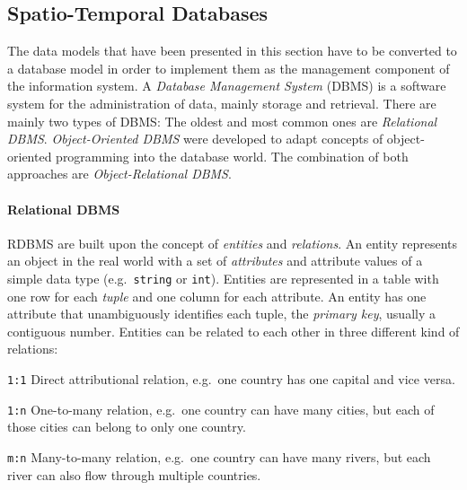 

\subsection{Spatio-Temporal Databases} %
\label{sub:spatio_temporal_databases}

The data models that have been presented in this section have to be converted to a database model in order to implement them as the management component of the information system. A \emph{Database Management System} (DBMS) is a software system for the administration of data, mainly storage and retrieval. There are mainly two types of DBMS: The oldest and most common ones are \emph{Relational DBMS}. \emph{Object-Oriented DBMS} were developed to adapt concepts of object-oriented programming into the database world. The combination of both approaches are \emph{Object-Relational DBMS}.

\paragraph{Relational DBMS} %
\label{par:relational_dbms}

RDBMS are built upon the concept of \emph{entities} and \emph{relations}. An entity represents an object in the real world with a set of \emph{attributes} and attribute values of a simple data type (e.g.\ \texttt{string} or \texttt{int}). Entities are represented in a table with one row for each \emph{tuple} and one column for each attribute. An entity has one attribute that unambiguously identifies each tuple, the \emph{primary key}, usually a contiguous number. Entities can be related to each other in three different kind of relations:
\begin{compactenum}
  \item[\texttt{1:1}] Direct attributional relation, e.g.\ one country has one capital and vice versa.
  \item[\texttt{1:n}] One-to-many relation, e.g.\ one country can have many cities, but each of those cities can belong to only one country.
  \item[\texttt{m:n}] Many-to-many relation, e.g.\ one country can have many rivers, but each river can also flow through multiple countries.
\end{compactenum}

